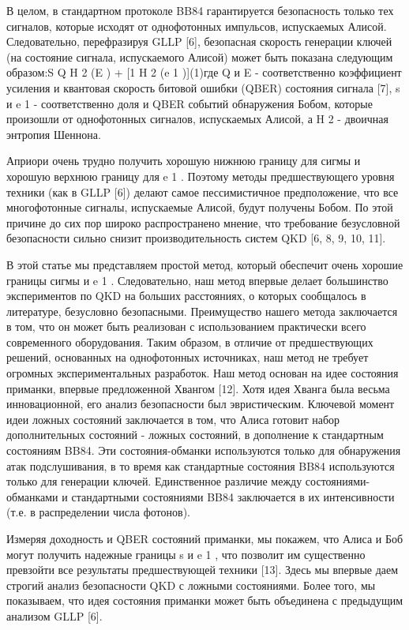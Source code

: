 В целом, в стандартном протоколе BB84 гарантируется безопасность только тех сигналов, которые исходят от однофотонных импульсов, испускаемых Алисой. Следовательно, перефразируя GLLP [6], безопасная скорость генерации ключей (на состояние сигнала, испускаемого Алисой) может быть показана следующим образом:S Q {H 2 (E ) + [1 H 2 (e 1 )]}(1)где Q и E - соответственно коэффициент усиления и квантовая скорость битовой ошибки (QBER) состояния сигнала [7], s и e 1 - соответственно доля и QBER событий обнаружения Бобом, которые произошли от однофотонных сигналов, испускаемых Алисой, а H 2 - двоичная энтропия Шеннона.

Априори очень трудно получить хорошую нижнюю границу для сигмы и хорошую верхнюю границу для e 1 . Поэтому методы предшествующего уровня техники (как в GLLP [6]) делают самое пессимистичное предположение, что все многофотонные сигналы, испускаемые Алисой, будут получены Бобом. По этой причине до сих пор широко распространено мнение, что требование безусловной безопасности сильно снизит производительность систем QKD [6, 8, 9, 10, 11].

В этой статье мы представляем простой метод, который обеспечит очень хорошие границы сигмы и e 1 . Следовательно, наш метод впервые делает большинство экспериментов по QKD на больших расстояниях, о которых сообщалось в литературе, безусловно безопасными. Преимущество нашего метода заключается в том, что он может быть реализован с использованием практически всего современного оборудования. Таким образом, в отличие от предшествующих решений, основанных на однофотонных источниках, наш метод не требует огромных экспериментальных разработок. Наш метод основан на идее состояния приманки, впервые предложенной Хвангом [12]. Хотя идея Хванга была весьма инновационной, его анализ безопасности был эвристическим. Ключевой момент идеи ложных состояний заключается в том, что Алиса готовит набор дополнительных состояний - ложных состояний, в дополнение к стандартным состояниям BB84. Эти состояния-обманки используются только для обнаружения атак подслушивания, в то время как стандартные состояния BB84 используются только для генерации ключей. Единственное различие между состояниями-обманками и стандартными состояниями BB84 заключается в их интенсивности (т.е. в распределении числа фотонов).

Измеряя доходность и QBER состояний приманки, мы покажем, что Алиса и Боб могут получить надежные границы s и e 1 , что позволит им существенно превзойти все результаты предшествующей техники [13]. Здесь мы впервые даем строгий анализ безопасности QKD с ложными состояниями. Более того, мы показываем, что идея состояния приманки может быть объединена с предыдущим анализом GLLP [6].

